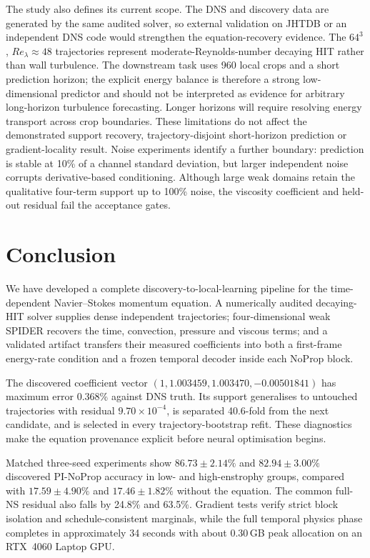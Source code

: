 \documentclass[preprint,12pt]{elsarticle}
\begin{document}
The study also defines its current scope. The DNS and discovery data are
generated by the same audited solver, so external validation on JHTDB or an
independent DNS code would strengthen the equation-recovery evidence. The
$64^3$, $Re_\lambda\approx48$ trajectories represent moderate-Reynolds-number
decaying HIT rather than wall turbulence. The downstream task uses 960 local
crops and a short prediction horizon; the explicit energy balance is therefore
a strong low-dimensional predictor and should not be interpreted as evidence
for arbitrary long-horizon turbulence forecasting. Longer horizons will require
resolving energy transport across crop boundaries. These limitations do not
affect the demonstrated support recovery, trajectory-disjoint short-horizon
prediction or gradient-locality result. Noise experiments identify a further
boundary: prediction is stable at 10\% of a channel standard deviation, but
larger independent noise corrupts derivative-based conditioning. Although
large weak domains retain the qualitative four-term support up to 100\% noise,
the viscosity coefficient and held-out residual fail the acceptance gates.
\section{Conclusion}
\label{sec:conclusion}

We have developed a complete discovery-to-local-learning pipeline for the
time-dependent Navier--Stokes momentum equation. A numerically audited
decaying-HIT solver supplies dense independent trajectories; four-dimensional
weak SPIDER recovers the time, convection, pressure and viscous terms; and a
validated artifact transfers their measured coefficients into both a
first-frame energy-rate condition and a frozen temporal decoder inside each
NoProp block.

The discovered coefficient vector
$(1,1.003459,1.003470,-0.00501841)$ has maximum error 0.368\% against DNS
truth. Its support generalises to untouched trajectories with residual
$9.70\times10^{-4}$, is separated 40.6-fold from the next candidate, and is
selected in every trajectory-bootstrap refit. These diagnostics make the
equation provenance explicit before neural optimisation begins.

Matched three-seed experiments show $86.73\pm2.14\%$ and
$82.94\pm3.00\%$ discovered PI-NoProp accuracy in low- and high-enstrophy
groups, compared with $17.59\pm4.90\%$ and $17.46\pm1.82\%$ without the
equation. The common full-NS residual also falls by 24.8\% and 63.5\%.
Gradient tests verify strict block isolation and schedule-consistent marginals,
while the full temporal physics phase completes in approximately 34 seconds
with about 0.30\,GB peak allocation on an RTX~4060 Laptop GPU.
\end{document}
